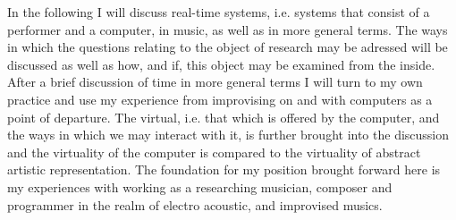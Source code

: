 In the following I will discuss real-time systems, i.e. systems that consist of a performer and a computer, in music, as well as in more general terms. The ways in which the questions relating to the object of research may be adressed will be discussed as well as how, and if, this object may be examined from the inside.
After a brief discussion of time in more general terms I will turn to my own practice and use my experience from improvising on and with computers as a point of departure. The virtual, i.e. that which is offered by the computer, and the ways in which we may interact with it, is further brought into the discussion and the virtuality of the computer is compared to the virtuality of abstract artistic representation. The foundation for my position brought forward here is my experiences with working as a researching musician, composer and programmer in the realm of electro acoustic, and improvised musics. %

